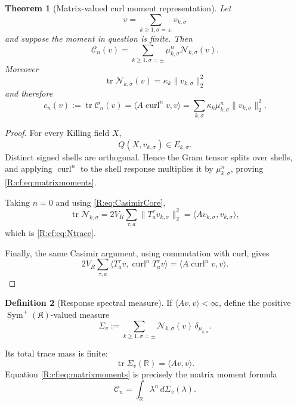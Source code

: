 \documentclass[
 aps,
 prd,
 reprint,
 amsmath,
 amssymb,
 nofootinbib,
 superscriptaddress
]{revtex4-2}
\newtheorem{theorem}{Theorem}[section]
\theoremstyle{definition}
\newtheorem{definition}[theorem]{Definition}
\theoremstyle{remark}
\newcommand{\cK}{\mathfrak K}
\newcommand{\cC}{\mathscr C}
\newcommand{\cN}{\mathscr N}
\newcommand{\curl}{\operatorname{curl}}
\newcommand{\tr}{\operatorname{tr}}
\begin{document}
\begin{theorem}[Matrix-valued curl moment representation]
\label{R:cf:thm:momentrepresentation}
Let
\[
       v=\sum_{k\ge1,\sigma=\pm}v_{k,\sigma}
\]
and suppose the moment in question is finite.  Then
\begin{equation}
 \boxed{
 \cC_n(v)
 =
 \sum_{k\ge1,\sigma=\pm}
 \mu_{k,\sigma}^n
 \cN_{k,\sigma}(v).
 }
 \label{R:cf:eq:matrixmoments}
\end{equation}
Moreover
\begin{equation}
 \boxed{
 \tr\cN_{k,\sigma}(v)
 =
 \kappa_k\|v_{k,\sigma}\|_2^2
 }
 \label{R:cf:eq:Ntrace}
\end{equation}
and therefore
\begin{equation}
 \boxed{
 c_n(v)
 :=
 \tr\cC_n(v)
 =
 \langle A\curl^n v,v\rangle
 =
 \sum_{k,\sigma}
 \kappa_k\mu_{k,\sigma}^n
 \|v_{k,\sigma}\|_2^2.
 }
 \label{R:cf:eq:scalarcurlmoments}
\end{equation}
\end{theorem}

\begin{proof}
For every Killing field $X$,
\[
       Q(X,v_{k,\sigma})\in E_{k,\sigma}.
\]
Distinct signed shells are orthogonal.  Hence the Gram tensor splits over
shells, and applying $\curl^n$ to the shell response multiplies it by
$\mu_{k,\sigma}^n$, proving \eqref{R:cf:eq:matrixmoments}.

Taking $n=0$ and using \eqref{R:eq:CasimirCore},
\[
 \tr\cN_{k,\sigma}
 =
 2V_R\sum_{\tau,a}
 \|T_a^\tau v_{k,\sigma}\|_2^2
 =
 \langle Av_{k,\sigma},v_{k,\sigma}\rangle,
\]
which is \eqref{R:cf:eq:Ntrace}.

Finally, the same Casimir argument, using commutation with curl, gives
\[
 2V_R\sum_{\tau,a}
 \langle T_a^\tau v,\curl^nT_a^\tau v\rangle
 =
 \langle A\curl^n v,v\rangle.
\]
\end{proof}

\begin{definition}[Response spectral measure]
If $\langle Av,v\rangle<\infty$, define the positive
$\operatorname{Sym}^+(\cK)$-valued measure
\begin{equation}
 \boxed{
 \Sigma_v
 :=
 \sum_{k\ge1,\sigma=\pm}
 \cN_{k,\sigma}(v)\,
 \delta_{\mu_{k,\sigma}}.
 }
 \label{R:cf:eq:Sigmav}
\end{equation}
\end{definition}

Its total trace mass is finite:
\[
        \tr\Sigma_v(\mathbb R)
        =
        \langle Av,v\rangle.
\]
Equation \eqref{R:cf:eq:matrixmoments} is precisely the matrix moment formula
\[
       \cC_n
       =
       \int_{\mathbb R}\lambda^n\,d\Sigma_v(\lambda).
\]
\end{document}
